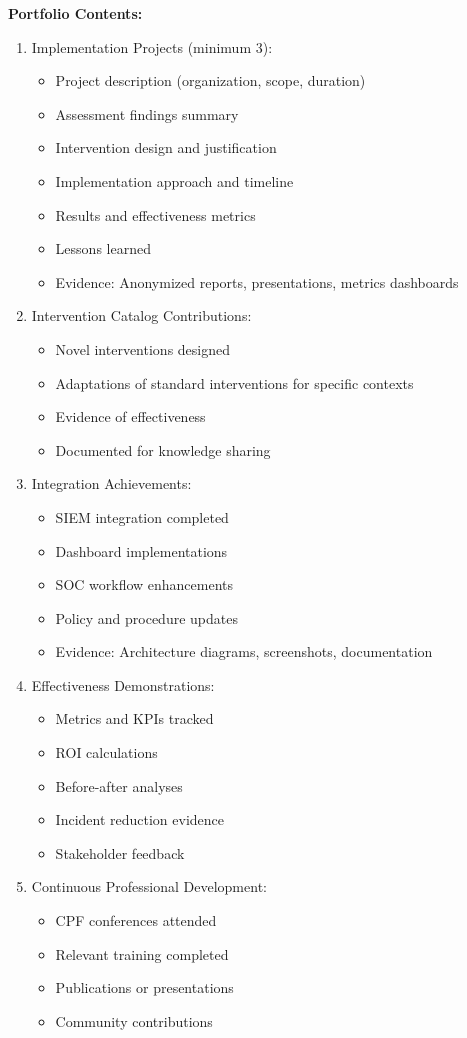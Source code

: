 \documentclass[11pt,a4paper]{article}
\begin{document}
\textbf{Portfolio Contents:}
\begin{enumerate}
\item Implementation Projects (minimum 3):
\begin{itemize}
\item Project description (organization, scope, duration)
\item Assessment findings summary
\item Intervention design and justification
\item Implementation approach and timeline
\item Results and effectiveness metrics
\item Lessons learned
\item Evidence: Anonymized reports, presentations, metrics dashboards
\end{itemize}

\item Intervention Catalog Contributions:
\begin{itemize}
\item Novel interventions designed
\item Adaptations of standard interventions for specific contexts
\item Evidence of effectiveness
\item Documented for knowledge sharing
\end{itemize}

\item Integration Achievements:
\begin{itemize}
\item SIEM integration completed
\item Dashboard implementations
\item SOC workflow enhancements
\item Policy and procedure updates
\item Evidence: Architecture diagrams, screenshots, documentation
\end{itemize}

\item Effectiveness Demonstrations:
\begin{itemize}
\item Metrics and KPIs tracked
\item ROI calculations
\item Before-after analyses
\item Incident reduction evidence
\item Stakeholder feedback
\end{itemize}

\item Continuous Professional Development:
\begin{itemize}
\item CPF conferences attended
\item Relevant training completed
\item Publications or presentations
\item Community contributions
\end{itemize}
\end{enumerate}
\end{document}
